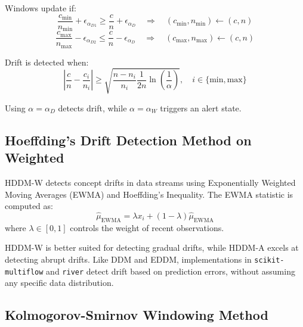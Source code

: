 Windows update if:
\begin{equation}
\frac{c_{\text{min}}}{n_{\text{min}}} + \epsilon_{\alpha_{D1}} \geq \frac{c}{n} + \epsilon_{\alpha_D} \quad \Rightarrow \quad (c_{\text{min}}, n_{\text{min}}) \leftarrow (c, n)
\end{equation}
\begin{equation}
\frac{c_{\text{max}}}{n_{\text{max}}} - \epsilon_{\alpha_{D2}} \leq \frac{c}{n} - \epsilon_{\alpha_D} \quad \Rightarrow \quad (c_{\text{max}}, n_{\text{max}}) \leftarrow (c, n)
\end{equation}

Drift is detected when:
\begin{equation}
\left| \frac{c}{n} - \frac{c_i}{n_i} \right| \geq \sqrt{\frac{n - n_i}{n_i} \frac{1}{2n} \ln \left(\frac{1}{\alpha}\right)}, \quad i \in \{\text{min}, \text{max}\}
\end{equation}

Using \(\alpha = \alpha_D\) detects drift, while \(\alpha = \alpha_W\) triggers an alert state.

\hypertarget{hoeffdings-drift-detection-method-on-weighted}{%
\subsection{Hoeffding's Drift Detection Method on Weighted}\label{hoeffdings-drift-detection-method-on-weighted}}

HDDM-W detects concept drifts in data streams using Exponentially Weighted Moving Averages (EWMA) and Hoeffding's Inequality. The EWMA statistic is computed as:
\begin{equation}
\hat{\mu}_{\text{EWMA}} = \lambda x_i + (1 - \lambda) \hat{\mu}_{\text{EWMA}}
\end{equation}
where \(\lambda \in [0,1]\) controls the weight of recent observations.

HDDM-W is better suited for detecting gradual drifts, while HDDM-A excels at detecting abrupt drifts. Like DDM and EDDM, implementations in \texttt{scikit-multiflow} and \texttt{river} detect drift based on prediction errors, without assuming any specific data distribution.

\hypertarget{kolmogorov-smirnov-windowing-method}{%
\subsection{Kolmogorov-Smirnov Windowing Method}\label{kolmogorov-smirnov-windowing-method}}

